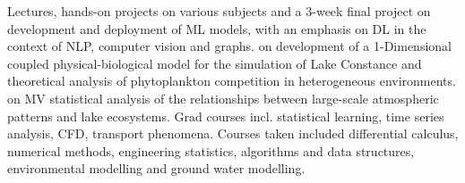 \documentclass[
	a4paper,
]{fortysecondscv}
\begin{document}
\begin{cvtable}[1.0]
		{Lectures, hands-on projects on various subjects and a 3-week final project on development and deployment of ML models, with an emphasis on DL in the context of NLP, computer vision and graphs.}
		{\href{https://kops.uni-konstanz.de/bitstream/handle/123456789/16454/Kerimoglu_2011_PhD_Dissertation.pdf?isAllowed=y&sequence=1}{\color{pblue}{Thesis}} on development of a 1-Dimensional coupled physical-biological model for the simulation of Lake Constance and theoretical analysis of phytoplankton competition in heterogeneous environments.}
		{\href{http://etd.lib.metu.edu.tr/upload/12609272/index.pdf}{\color{pblue}{Thesis}} on MV statistical analysis of the relationships between large-scale atmospheric patterns and lake ecosystems. Grad courses incl. statistical learning, time series analysis, CFD, transport phenomena.}
		{Courses taken included differential calculus, numerical methods, engineering statistics, algorithms and data structures, environmental modelling and ground water modelling.}
\end{cvtable}
\end{document}
